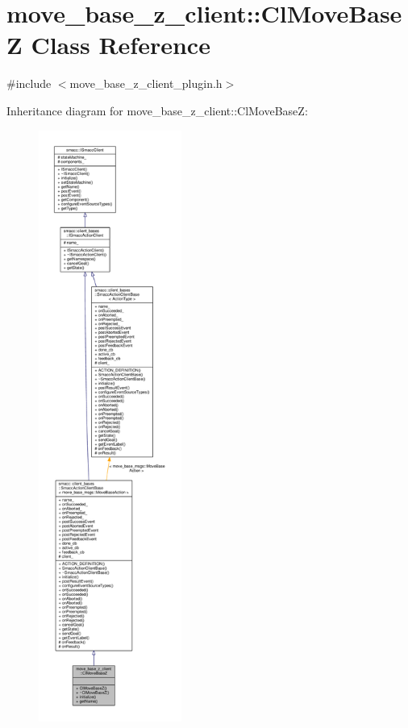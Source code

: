 \hypertarget{classmove__base__z__client_1_1ClMoveBaseZ}{}\section{move\+\_\+base\+\_\+z\+\_\+client\+:\+:Cl\+Move\+BaseZ Class Reference}
\label{classmove__base__z__client_1_1ClMoveBaseZ}


{\ttfamily \#include $<$move\+\_\+base\+\_\+z\+\_\+client\+\_\+plugin.\+h$>$}



Inheritance diagram for move\+\_\+base\+\_\+z\+\_\+client\+:\+:Cl\+Move\+BaseZ\+:\nopagebreak
\begin{figure}[H]
\begin{center}
\leavevmode
\includegraphics[height=550pt]{classmove__base__z__client_1_1ClMoveBaseZ__inherit__graph}
\end{center}
\end{figure}


